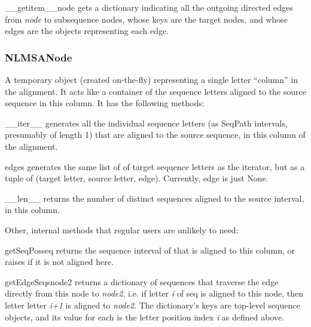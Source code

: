 \documentclass{howto}
\begin{document}
\begin{funcdesc}{__getitem__}{node}
  gets a dictionary indicating all the outgoing
  directed edges from {\em node} to subsequence nodes, whose keys are
  the target nodes, and whose edges are the 
   objects representing each edge.
\end{funcdesc}

\subsubsection{NLMSANode}
A temporary object (created on-the-fly) 
representing a single letter ``column'' in the alignment.  It acts like
a container of the sequence letters aligned to the source sequence in
this column.  It has the following methods:

\begin{funcdesc}{__iter__}{}
  generates all the individual sequence letters 
  (as SeqPath intervals, presumably of length 1) that are aligned to 
  the source sequence, in this column of the alignment.
\end{funcdesc}

    
\begin{funcdesc}{edges}{}
  generates the same list of of target sequence letters as
  the iterator, but as a tuple of (target letter, source letter, edge).
  Currently, edge is just None.
\end{funcdesc}

\begin{funcdesc}{__len__}{}
  returns the number of distinct sequences aligned to
  the source interval, in this column.
\end{funcdesc}

Other, internal methods that regular users are unlikely to need:

\begin{funcdesc}{getSeqPos}{seq}
  returns the sequence interval of 
  that is aligned to this column, or raises  if it is not
  aligned here.
\end{funcdesc}


\begin{funcdesc}{getEdgeSeqs}{node2}
  returns a dictionary of sequences
  that traverse the edge directly from this node to {\em node2},
  i.e. if letter {\em i} of seq is aligned to this node, then
  letter letter {\em i+1} is aligned to {\em node2}.  The
  dictionary's keys are top-level sequence objects, and its
  value for each is the letter position index {\em i} as defined above.
\end{funcdesc}
\end{document}
